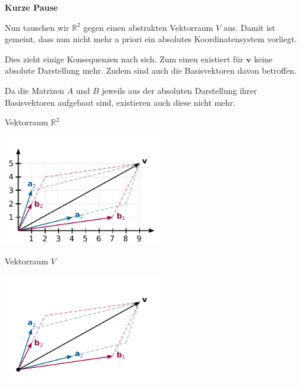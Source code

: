 \documentclass[9pt]{beamer}
\newcommand{\bv}[1]{\mathbf{#1}}
\newcommand{\R}{\mathbb R}
\newcommand{\strong}[1]{\textsf{\textbf{#1}}}
\newcommand{\parspace}{\vspace{0.8em}}
\begin{document}
\begin{frame}
\begin{center}
\strong{Kurze Pause}
\end{center}
\end{frame}

\begin{frame}
Nun tauschen wir $\R^2$ gegen einen abstrakten Vektorraum $V$ aus.
Damit ist gemeint, dass nun nicht mehr a priori ein absolutes
Koordinatensystem vorliegt.\pause

\parspace
Dies zieht einige Konsequenzen nach sich. Zum einen existiert für
$\bv v$ keine absolute Darstellung mehr. Zudem sind auch die
Basisvektoren davon betroffen.\pause

\parspace
Da die Matrizen $A$ und $B$ jeweils aus der absoluten Darstellung
ihrer Basisvektoren aufgebaut sind, existieren auch diese nicht mehr.
\end{frame}

\begin{frame}
\begin{center}Vektorraum $\R^2$\end{center}

\vspace{-2em}
\begin{center}
\includegraphics[width=72mm]{img/Vektor-in-Basis-AB.pdf}
\end{center}
\end{frame}

\begin{frame}
\begin{center}Vektorraum $V$\end{center}

\vspace{-2em}
\begin{center}
\includegraphics[width=72mm]{img/Abstrakt-in-Basis-AB.pdf}
\end{center}
\end{frame}
\end{document}
